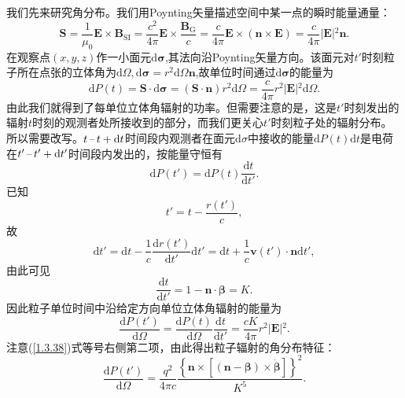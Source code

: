 \documentclass[../天体物理基础.tex]{subfiles}
\begin{document}
我们先来研究角分布。我们用Poynting矢量描述空间中某一点的瞬时能量通量：
\begin{equation}
\boldsymbol{S}=\frac{1}{\mu_{0}}\boldsymbol{E}\times\boldsymbol{B}_{\text{SI}}=\frac{c^{2}}{4\pi}\boldsymbol{E}\times\frac{\boldsymbol{B}_{\text{G}}}{c}=\frac{c}{4\pi}\boldsymbol{E}\times\left(\boldsymbol{n}\times\boldsymbol{E}\right)=\frac{c}{4\pi}\left\vert{}\boldsymbol{E}\right\vert{}^{2}\boldsymbol{n}.
\end{equation}
在观察点$\left(x,y,z\right)$作一小面元$\mathrm{d}\boldsymbol{\sigma}$,其法向沿Poynting矢量方向。该面元对$t'$时刻粒子所在点张的立体角为$\mathrm{d}\Omega,\mathrm{d}\boldsymbol{\sigma}=r^{2}\mathrm{d}\Omega\boldsymbol{n}$,故单位时间通过$\mathrm{d}\boldsymbol{\sigma}$的能量为
\begin{equation}
\mathrm{d}P\left(t\right)=\boldsymbol{S}\cdot\mathrm{d}\boldsymbol{\sigma}=\left(\boldsymbol{S}\cdot\boldsymbol{n}\right)r^{2}\mathrm{d}\Omega=\frac{c}{4\pi}r^{2}\left\vert{}\boldsymbol{E}\right\vert{}^{2}\mathrm{d}\Omega.
\end{equation}
由此我们就得到了每单位立体角辐射的功率。但需要注意的是，这是$t'$时刻发出的辐射$t$时刻的观测者处所接收到的部分，而我们更关心$t'$时刻粒子处的辐射分布。所以需要改写。$t\,\text{\textendash}\,t+\mathrm{d}t$时间段内观测者在面元$\mathrm{d}\sigma$中接收的能量$\mathrm{d}P\left(t\right)\mathrm{d}t$是电荷在$t'\,\text{\textendash}\,t'+\mathrm{d}t'$时间段内发出的，按能量守恒有
\begin{equation}
\mathrm{d}P\left(t'\right)=\mathrm{d}P\left(t\right)\frac{\mathrm{d}t}{\mathrm{d}t'}.
\end{equation}
已知
\begin{equation}
t'=t-\frac{r\left(t'\right)}{c},
\end{equation}
故
\begin{equation}
\mathrm{d}t'=\mathrm{d}t-\frac{1}{c}\frac{\mathrm{d}r\left(t'\right)}{\mathrm{d}t'}\mathrm{d}t'=\mathrm{d}t+\frac{1}{c}\boldsymbol{v}\left(t'\right)\cdot\boldsymbol{n}\mathrm{d}t',
\end{equation}
由此可见
\begin{equation}
\frac{\mathrm{d}t}{\mathrm{d}t'}=1-\boldsymbol{n}\cdot\boldsymbol{\beta}=K.
\end{equation}
因此粒子单位时间中沿给定方向单位立体角辐射的能量为
\begin{equation}
\frac{\mathrm{d}P\left(t'\right)}{\mathrm{d}\Omega}=\frac{\mathrm{d}P\left(t\right)}{\mathrm{d}\Omega}\frac{\mathrm{d}t}{\mathrm{d}t'}=\frac{cK}{4\pi}r^{2}\left\vert{}\boldsymbol{E}\right\vert{}^{2}.
\end{equation}
注意(\ref{1.3.38})式等号右侧第二项，由此得出粒子辐射的角分布特征：
\begin{equation}
\frac{\mathrm{d}P\left(t'\right)}{\mathrm{d}\Omega}=\frac{q^{2}}{4\pi c}\frac{\left\{\boldsymbol{n}\times\left[\left(\boldsymbol{n}-\boldsymbol{\beta}\right)\times\dot{\boldsymbol{\beta}}\right]\right\}^{2}}{K^{5}}.\label{1.3.46}
\end{equation}
\end{document}
